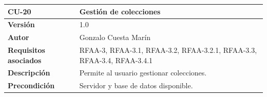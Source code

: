 \documentclass[
]{article}
\begin{document}
\begin{longtable}[]{@{}ll@{}}
\toprule
\begin{minipage}[b]{0.18\columnwidth}\raggedright
\textbf{CU-20}\strut
\end{minipage} & \begin{minipage}[b]{0.76\columnwidth}\raggedright
\textbf{Gestión de colecciones}\strut
\end{minipage}\tabularnewline
\midrule
\endhead
\begin{minipage}[t]{0.18\columnwidth}\raggedright
\textbf{Versión}\strut
\end{minipage} & \begin{minipage}[t]{0.76\columnwidth}\raggedright
1.0\strut
\end{minipage}\tabularnewline
\begin{minipage}[t]{0.18\columnwidth}\raggedright
\textbf{Autor}\strut
\end{minipage} & \begin{minipage}[t]{0.76\columnwidth}\raggedright
Gonzalo Cuesta Marín\strut
\end{minipage}\tabularnewline
\begin{minipage}[t]{0.18\columnwidth}\raggedright
\textbf{Requisitos asociados}\strut
\end{minipage} & \begin{minipage}[t]{0.76\columnwidth}\raggedright
RFAA-3, RFAA-3.1, RFAA-3.2, RFAA-3.2.1, RFAA-3.3, RFAA-3.4,
RFAA-3.4.1\strut
\end{minipage}\tabularnewline
\begin{minipage}[t]{0.18\columnwidth}\raggedright
\textbf{Descripción}\strut
\end{minipage} & \begin{minipage}[t]{0.76\columnwidth}\raggedright
Permite al usuario gestionar colecciones.\strut
\end{minipage}\tabularnewline
\begin{minipage}[t]{0.18\columnwidth}\raggedright
\textbf{Precondición}\strut
\end{minipage} & \begin{minipage}[t]{0.76\columnwidth}\raggedright
Servidor y base de datos disponible.


\end{minipage}
\end{longtable}
\end{document}
